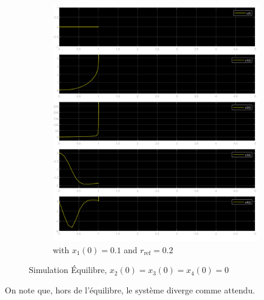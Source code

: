 \documentclass[class=article, crop=false]{standalone}
\begin{document}
\begin{resolution}
\begin{figure}[H]
\begin{subfigure}[b]{0.425\textwidth}
            \includegraphics[width=\textwidth]{../images/simulink_scope20_02_01.png}
            \caption{with $x_1(0) = 0.1$ and $r_{\text{ref}} = 0.2$}
        \end{subfigure}
        \caption{Simulation Équilibre, $x_2(0) = x_3(0) = x_4(0) = 0$}
        \label{fig:simulink_simulation_équilibre}
    \end{figure}
    On note que, hors de l'équilibre, le système diverge comme attendu.
\end{resolution}

\newpage
\end{document}
